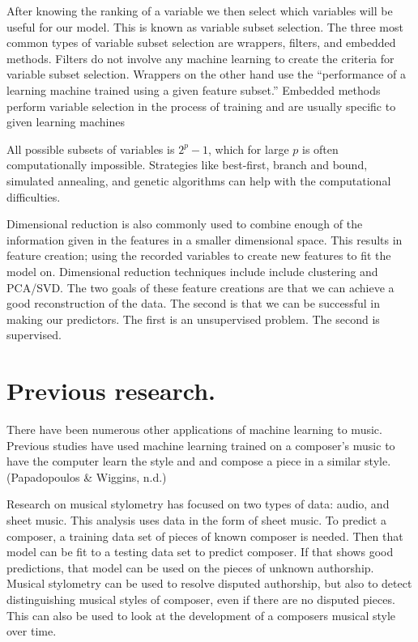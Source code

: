 \documentclass[12pt,twoside]{reedthesis}
\theoremstyle{definition}
\theoremstyle{definition}
\theoremstyle{definition}
\theoremstyle{remark}
\begin{document}
After knowing the ranking of a variable we then select which variables
will be useful for our model. This is known as variable subset
selection. The three most common types of variable subset selection are
wrappers, filters, and embedded methods. Filters do not involve any
machine learning to create the criteria for variable subset selection.
Wrappers on the other hand use the ``performance of a learning machine
trained using a given feature subset.'' Embedded methods perform
variable selection in the process of training and are usually specific
to given learning machines

All possible subsets of variables is \(2^p-1\), which for large \(p\) is
often computationally impossible. Strategies like best-first, branch and
bound, simulated annealing, and genetic algorithms can help with the
computational difficulties.

Dimensional reduction is also commonly used to combine enough of the
information given in the features in a smaller dimensional space. This
results in feature creation; using the recorded variables to create new
features to fit the model on. Dimensional reduction techniques include
include clustering and PCA/SVD. The two goals of these feature creations
are that we can achieve a good reconstruction of the data. The second is
that we can be successful in making our predictors. The first is an
unsupervised problem. The second is supervised.

\section{Previous research.}\label{previous-research.}

There have been numerous other applications of machine learning to
music. Previous studies have used machine learning trained on a
composer's music to have the computer learn the style and and compose a
piece in a similar style. (Papadopoulos \& Wiggins, n.d.)

Research on musical stylometry has focused on two types of data: audio,
and sheet music. This analysis uses data in the form of sheet music. To
predict a composer, a training data set of pieces of known composer is
needed. Then that model can be fit to a testing data set to predict
composer. If that shows good predictions, that model can be used on the
pieces of unknown authorship. Musical stylometry can be used to resolve
disputed authorship, but also to detect distinguishing musical styles of
composer, even if there are no disputed pieces. This can also be used to
look at the development of a composers musical style over time.
\end{document}
